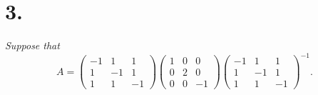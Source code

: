 \documentclass[12pt]{article}
\begin{document}
\section*{3.}
\textit{Suppose that}
\begin{equation*}
	A = 
	\begin{pmatrix}
		-1 & 1 & 1 \\
		1 & -1 & 1 \\
		1 & 1 & -1
	\end{pmatrix}
	\begin{pmatrix}
		1 & 0 & 0 \\
		0 & 2 & 0 \\
		0 & 0 & -1
	\end{pmatrix}
	\begin{pmatrix}
		-1 & 1 & 1 \\
		1 & -1 & 1 \\
		1 & 1 & -1
	\end{pmatrix}^{-1}
	.
\end{equation*}
\end{document}
